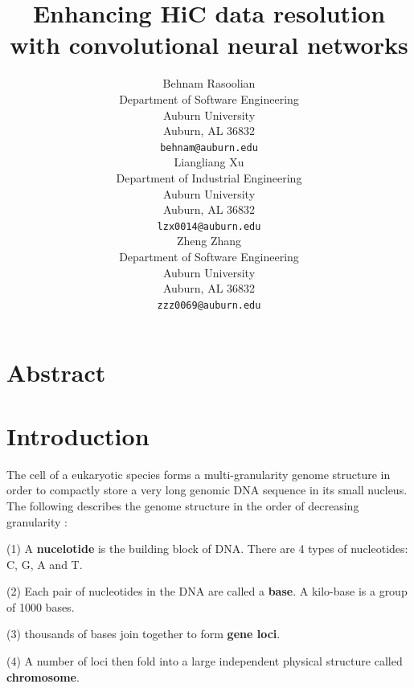 \documentclass{article}
\begin{document}
\title{Enhancing HiC data resolution with convolutional neural networks}

\author{
    Behnam Rasoolian \\
    Department of Software Engineering \\
    Auburn University \\
    Auburn, AL 36832 \\
    \texttt{behnam@auburn.edu} \\
    \And
    Liangliang Xu \\
    Department of Industrial Engineering \\
    Auburn University \\
    Auburn, AL 36832 \\
    \texttt{lzx0014@auburn.edu} \\
    \And
    Zheng Zhang \\
    Department of Software Engineering \\
    Auburn University \\
    Auburn, AL 36832 \\
    \texttt{zzz0069@auburn.edu} \\
}

\maketitle
\section{Abstract}
\section{Introduction}
The cell of a eukaryotic species forms a multi-granularity genome structure
in order to compactly store a very long genomic 
DNA sequence in its small nucleus. The following describes the genome
structure in the order of decreasing granularity
\cite{wang2013properties}:
\begin{enumerate*}
\item[(1)] A \textbf{nucelotide} is the building block of
DNA. There are 4 types of nucleotides: 
C, G, A and T. 
\item[(2)] Each pair of nucleotides in the DNA are called a \textbf{base}.
A kilo-base is a group of 1000 bases.
\item[(3)] thousands of bases join together to form \textbf{gene loci}.
\item[(4)] A number of loci then fold into a large
independent physical structure called \textbf{chromosome}.
\end{enumerate*}
\end{document}
